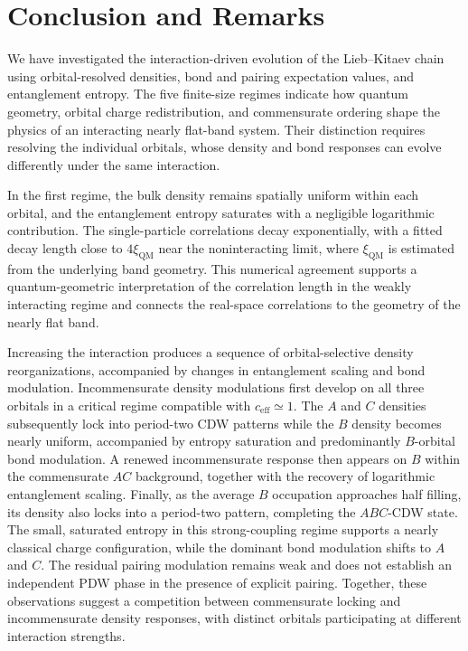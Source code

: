 \documentclass[
  prb,
  reprint,
  superscriptaddress,
  amsmath,
  amssymb,
  longbibliography
]{revtex4-2}
\begin{document}
\section{Conclusion and Remarks}
\label{sec:conclusion}


We have investigated the interaction-driven evolution of
the Lieb--Kitaev chain using orbital-resolved densities,
bond and pairing expectation values, and entanglement
entropy. The five finite-size regimes indicate how quantum
geometry, orbital charge redistribution, and commensurate
ordering shape the physics of an interacting nearly
flat-band system. Their distinction requires resolving
the individual orbitals, whose density and bond responses
can evolve differently under the same interaction.

In the first regime, the bulk density remains spatially
uniform within each orbital, and the entanglement entropy
saturates with a negligible logarithmic contribution.
The single-particle correlations decay exponentially,
with a fitted decay length close to $4\xi_{\mathrm{QM}}$
near the noninteracting limit, where $\xi_{\mathrm{QM}}$
is estimated from the underlying band geometry.
This numerical agreement supports a quantum-geometric
interpretation of the correlation length in the
weakly interacting regime and connects the real-space
correlations to the geometry of the nearly flat band.

Increasing the interaction produces a sequence of
orbital-selective density reorganizations, accompanied
by changes in entanglement scaling and bond modulation.
Incommensurate density modulations first develop on all
three orbitals in a critical regime compatible with
$c_{\mathrm{eff}}\simeq1$. The $A$ and $C$ densities
subsequently lock into period-two CDW patterns while
the $B$ density becomes nearly uniform, accompanied
by entropy saturation and predominantly $B$-orbital
bond modulation. A renewed incommensurate response
then appears on $B$ within the commensurate $AC$
background, together with the recovery of logarithmic
entanglement scaling. Finally, as the average $B$
occupation approaches half filling, its density also
locks into a period-two pattern, completing the
$ABC$-CDW state. The small, saturated entropy in this
strong-coupling regime supports a nearly classical
charge configuration, while the dominant bond
modulation shifts to $A$ and $C$. The residual pairing
modulation remains weak and does not establish an
independent PDW phase in the presence of explicit
pairing. Together, these observations suggest a
competition between commensurate locking and
incommensurate density responses, with distinct
orbitals participating at different interaction
strengths.
\end{document}
